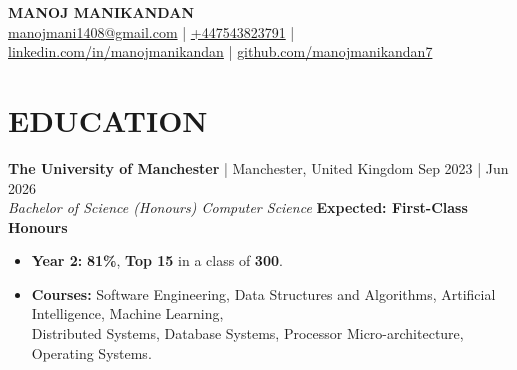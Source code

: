 \documentclass[a4paper,1.5pt]{extarticle}
\begin{document}
\pagestyle{empty}

\begin{center}
\textbf{\Large MANOJ MANIKANDAN}\\[2pt] %
\href{mailto:manojmani1408@gmail.com}{manojmani1408@gmail.com} | \href{tel:447543823791}{+447543823791}  | \href{https://www.linkedin.com/in/manojmanikandan}{linkedin.com/in/manojmanikandan}  |  \href{https://github.com/manojmanikandan7}{github.com/manojmanikandan7}
\end{center}
\section*{EDUCATION}
\textbf{The University of Manchester} | Manchester, United Kingdom \hfill Sep 2023 | Jun 2026\\ %
\textit{Bachelor of Science (Honours) Computer Science} \hfill \textbf{Expected: First-Class Honours} %
\begin{itemize}
    \item \textbf{Year 2: } \textbf{81\%}, \textbf{Top 15} in a class of \textbf{300}.
    \item \textbf{Courses:} Software Engineering, Data Structures and Algorithms, Artificial Intelligence, Machine Learning, \\
    Distributed Systems, Database Systems, Processor Micro-architecture, Operating Systems. %
\end{itemize}



\end{document}
